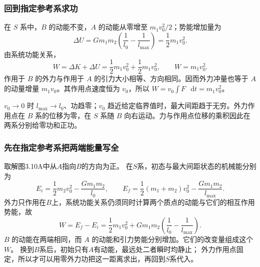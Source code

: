 \documentclass[UTF8,fontset=fandol,a4paper,11pt]{ctexart}
\newcommand{\dd}{\mathop{}\!\mathrm{d}}
\begin{document}
\subsubsection*{回到指定参考系求功}
在 $S$ 系中，$B$ 的动能不变，$A$ 的动能从零增至 $m_1v_0^2/2$；势能增加量为
\[
\Delta U=Gm_1m_2\left(\frac1{l_0}-\frac1{l_{\max}}\right)
=\frac12m_1v_0^2.
\]
由系统功能关系，
\[
W=\Delta K+\Delta U
=\frac12m_1v_0^2+\frac12m_1v_0^2,
\qquad \boxed{W=m_1v_0^2}.
\]
作用于 $B$ 的外力与作用于 $A$ 的引力大小相等、方向相同。因而外力冲量也等于 $A$ 的动量增量 $m_1v_0$。其作用点速度恒为 $v_0$，所以 $W=v_0\int F\,\dd t=m_1v_0^2$。

$v_0\to0$ 时 $l_{\max}\to l_0$、功趋零；$v_0$ 趋近给定临界值时，最大间距趋于无穷。外力作用点在 $B$ 系的位移为零，在 $S$ 系随 $B$ 向右运动。力与作用点位移的乘积因此在两系分别给零功和正功。
\subsubsection*{先在指定参考系把两端能量写全}
取解图3.10A中从$A$指向$B$的方向为正。
在$S$系，初态与最大间距状态的机械能分别为
\[
E_i=\frac12m_2v_0^2-\frac{Gm_1m_2}{l_0},\qquad
E_f=\frac12(m_1+m_2)v_0^2-\frac{Gm_1m_2}{l_{\max}}.
\]
外力只作用在$B$上，系统功能关系仍须同时计算两个质点的动能与它们的相互作用势能，故
\[
W=E_f-E_i
=\frac12m_1v_0^2+Gm_1m_2\left(\frac1{l_0}-\frac1{l_{\max}}\right).
\]
$B$ 的动能在两端相同，而 $A$ 的动能和引力势能分别增加。它们的改变量组成这个 $W$。
换到$B$系后，初始只有$A$有动能，最远处二者瞬时均静止；
外力作用点固定，所以才可以用零外力功把这一距离求出，再回到$S$系代入。
\end{document}
